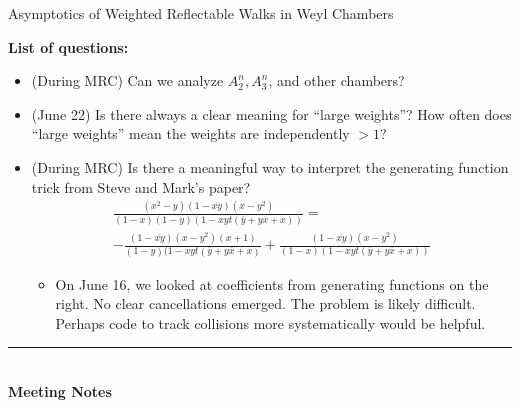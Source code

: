 \documentclass[letterpaper]{article}
\begin{document}
\fontsize{12}{13}
\large

\begin{center}
Asymptotics of Weighted Reflectable Walks in Weyl Chambers
\end{center}

{\bf List of questions:}
\begin{itemize}
\item (During MRC) Can we analyze $A_2^n, A_3^n$, and other chambers?
\item (June 22) Is there always a clear meaning for ``large weights''?  How often does ``large weights'' mean the weights are independently $>1$?
\item (During MRC) Is there a meaningful way to interpret the generating function trick from Steve and Mark's paper?
\begin{multline*}
\frac{(x^2 - y)(1 - \overline{xy})(x - y^2)}{(1 - x)(1 - y)(1 - xyt(\overline{y} + y\overline{x} + x))} =\\
 -\frac{(1 - \overline{xy})(x - y^2)(x + 1)}{(1 - y)(1 - xyt(\overline{y} + y\overline{x} + x)} + \frac{(1 - \overline{xy})(x - y^2)}{(1 - x)(1 - xyt(\overline{y} + y\overline{x} + x))}
\end{multline*}
\begin{itemize}
\item On June 16, we looked at coefficients from generating functions on the right.  No clear cancellations emerged.  The problem is likely difficult.  Perhaps code to track collisions more systematically would be helpful.
\end{itemize}
\end{itemize}

\hrule\ \\
{\bf Meeting Notes}\ \\\ \\
\end{document}
